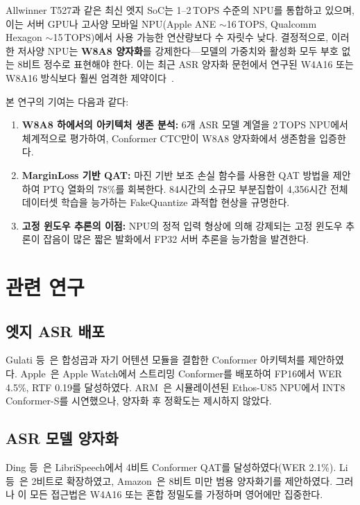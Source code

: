 \documentclass[a4paper,11pt,twocolumn]{article}
\begin{document}
Allwinner T527과 같은 최신 엣지 SoC는 1--2\,TOPS 수준의 NPU를 통합하고 있으며, 이는 서버 GPU나 고사양 모바일 NPU(Apple ANE ${\sim}$16\,TOPS, Qualcomm Hexagon ${\sim}$15\,TOPS)에서 사용 가능한 연산량보다 수 자릿수 낮다. 결정적으로, 이러한 저사양 NPU는 \textbf{W8A8 양자화}를 강제한다---모델의 가중치와 활성화 모두 부호 없는 8비트 정수로 표현해야 한다. 이는 최근 ASR 양자화 문헌에서 연구된 W4A16 또는 W8A16 방식보다 훨씬 엄격한 제약이다~\cite{ding2022,li2023,chen2025}.

본 연구의 기여는 다음과 같다:
\begin{enumerate}[leftmargin=*,itemsep=2pt]
    \item \textbf{W8A8 하에서의 아키텍처 생존 분석:} 6개 ASR 모델 계열을 2\,TOPS NPU에서 체계적으로 평가하여, Conformer CTC만이 W8A8 양자화에서 생존함을 입증한다.
    \item \textbf{MarginLoss 기반 QAT:} 마진 기반 보조 손실 함수를 사용한 QAT 방법을 제안하여 PTQ 열화의 78\%를 회복한다. 84시간의 소규모 부분집합이 4,356시간 전체 데이터셋 학습을 능가하는 FakeQuantize 과적합 현상을 규명한다.
    \item \textbf{고정 윈도우 추론의 이점:} NPU의 정적 입력 형상에 의해 강제되는 고정 윈도우 추론이 잡음이 많은 짧은 발화에서 FP32 서버 추론을 능가함을 발견한다.
\end{enumerate}

\section{관련 연구}

\subsection{엣지 ASR 배포}

Gulati 등~\cite{gulati2020}은 합성곱과 자기 어텐션 모듈을 결합한 Conformer 아키텍처를 제안하였다. Apple~\cite{apple2024}은 Apple Watch에서 스트리밍 Conformer를 배포하여 FP16에서 WER 4.5\%, RTF 0.19를 달성하였다. ARM~\cite{arm2025}은 시뮬레이션된 Ethos-U85 NPU에서 INT8 Conformer-S를 시연했으나, 양자화 후 정확도는 제시하지 않았다.

\subsection{ASR 모델 양자화}

Ding 등~\cite{ding2022}은 LibriSpeech에서 4비트 Conformer QAT를 달성하였다(WER 2.1\%). Li 등~\cite{li2023}은 2비트로 확장하였고, Amazon~\cite{amazon2022}은 8비트 미만 범용 양자화기를 제안하였다. 그러나 이 모든 접근법은 W4A16 또는 혼합 정밀도를 가정하며 영어에만 집중한다.
\end{document}
